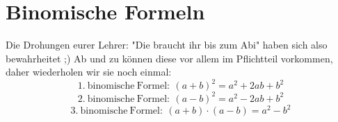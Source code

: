 \section{Binomische Formeln}
	Die Drohungen eurer Lehrer: "Die braucht ihr bis zum Abi" haben sich also
	bewahrheitet ;) Ab und zu können diese vor allem im Pflichtteil vorkommen,
	daher wiederholen wir sie noch einmal:
	\[\mathrm{1.\ binomische\ Formel:\ }(a+b)^2=a^2+2ab+b^2\]
	\[\mathrm{2.\ binomische\ Formel:\ }(a-b)^2=a^2-2ab+b^2\]
	\[\mathrm{3.\ binomische\ Formel:\ }(a+b)\cdot (a-b)=a^2-b^2\]